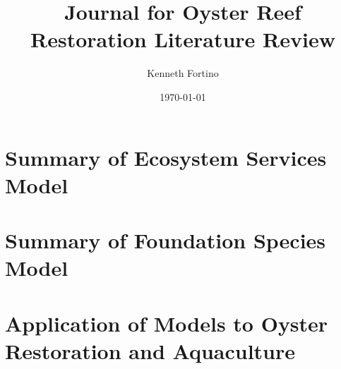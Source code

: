 \documentclass{article}
\begin{document}
\title{Journal for Oyster Reef Restoration Literature Review}
\author{Kenneth Fortino}
\date{\today}

\maketitle

\section{Summary of Ecosystem Services Model}

\section{Summary of Foundation Species Model}

\section{Application of Models to Oyster Restoration and Aquaculture}
\end{document}
